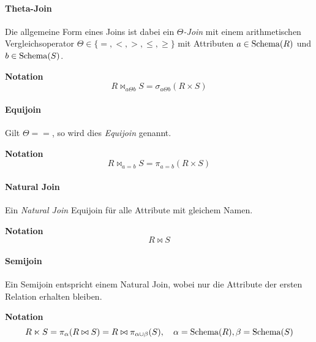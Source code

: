                 \paragraph{Theta-Join} %
                    Die allgemeine Form eines Joins ist dabei ein \textit{\(\Theta\)-Join} mit einem arithmetischen Vergleichsoperator \( \Theta \in \{ =, <, >, \leq, \geq \} \) mit Attributen \( a \in \operatorname{Schema}(R) \) und \( b \in \operatorname{Schema}(S) \).
                    
                    \textbf{Notation}
                    \begin{equation*}
                        R \bowtie _ { a \Theta b } S = \sigma _ { a \Theta b } (R \times S)
                    \end{equation*}

                \paragraph{Equijoin} %
                    Gilt \( \Theta = = \), so wird dies \textit{Equijoin} genannt.
                    
                    \textbf{Notation}
                    \begin{equation*}
                        R \bowtie _ { a = b } S = \pi _ { a = b } (R \times S)
                    \end{equation*}

                \paragraph{Natural Join} %
                    Ein \textit{Natural Join} Equijoin für alle Attribute mit gleichem Namen.
                    
                    \textbf{Notation}
                    \begin{equation*}
                        R \bowtie S
                    \end{equation*}

                \paragraph{Semijoin} %
                    Ein Semijoin entspricht einem Natural Join, wobei nur die Attribute der ersten Relation erhalten bleiben.
                    
                    \textbf{Notation}
                    \begin{equation*}
                    	R \ltimes S = \pi_\alpha(R \bowtie S) = R \bowtie \pi_{\alpha \cup \beta} (S), \quad \alpha = \operatorname{Schema}(R), \beta = \operatorname{Schema}(S)
                    \end{equation*}

